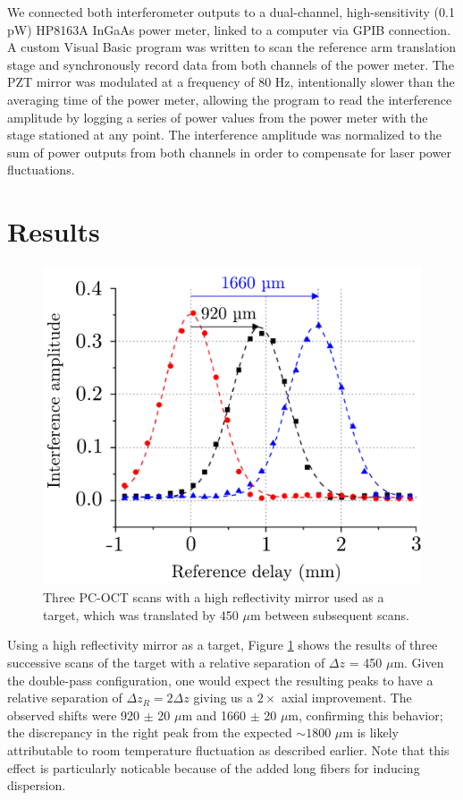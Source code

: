 We connected both interferometer outputs to a dual-channel, high-sensitivity (0.1 pW) HP8163A InGaAs power meter, linked to a computer via GPIB connection. A custom Visual Basic program was written to scan the reference arm translation stage and synchronously record data from both channels of the power meter. The PZT mirror was modulated at a frequency of 80 Hz, intentionally slower than the averaging time of the power meter, allowing the program to read the interference amplitude by logging a series of power values from the power meter with the stage stationed at any point. The interference amplitude was normalized to the sum of power outputs from both channels in order to compensate for laser power fluctuations.

\section{Results}

\begin{figure}[t]
\begin{center}
\includegraphics[width=12cm]{figure-pcoct-result.pdf}
\caption{Three PC-OCT scans with a high reflectivity mirror used as a target, which was translated by 450 $\mu$m between subsequent scans.}
\label{figure:pcoct-result}
\end{center}
\end{figure}

Using a high reflectivity mirror as a target, Figure \ref{figure:pcoct-result} shows the results of three successive scans of the target with a relative separation of $\Delta z$ = 450 $\mu$m. Given the double-pass configuration, one would expect the resulting peaks to have a relative separation of $\Delta z_R = 2\Delta z$ giving us a $2\times$ axial improvement. The observed shifts were 920 $\pm$ 20 $\mu$m and 1660 $\pm$ 20 $\mu$m, confirming this behavior; the discrepancy in the right peak from the expected $\sim 1800$ $\mu$m is likely attributable to room temperature fluctuation as described earlier. Note that this effect is particularly noticable because of the added long fibers for inducing dispersion.

